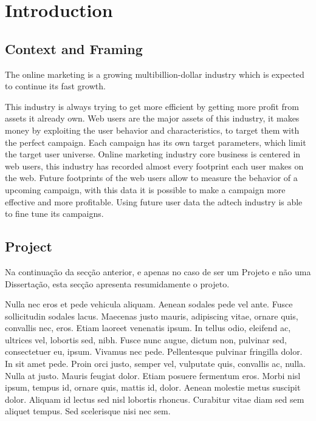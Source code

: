 \chapter{Introduction} \label{chap:intro}


\section{Context and Framing} \label{sec:context}

The online marketing is a growing multibillion-dollar industry \cite{PricewaterhouseCoopers2013}
which is expected to continue its fast growth.\cite{PricewaterhouseCoopers2013a}

This industry is always trying to get more efficient by getting more profit from assets it already own. 
Web users are the major assets of this industry, it makes money by exploiting the user behavior and characteristics, to target them with the
perfect campaign. Each campaign has its own target parameters, which limit the target user universe.
Online marketing industry core business is centered in web users, this industry has recorded almost every footprint each user makes on the web.
Future footprints of the web users allow to measure the behavior of a upcoming campaign, with this data it is possible to make a campaign more
effective and more profitable. Using future user data the adtech industry is able to fine tune its campaigns. 

\section{Project} \label{sec:proj}

Na continuação da secção anterior, e apenas no caso de ser um Projeto
e não uma Dissertação, esta secção apresenta resumidamente o projeto.

Nulla nec eros et pede vehicula aliquam. Aenean sodales pede vel
ante. Fusce sollicitudin sodales lacus. Maecenas justo mauris,
adipiscing vitae, ornare quis, convallis nec, eros. Etiam laoreet
venenatis ipsum. In tellus odio, eleifend ac, ultrices vel, lobortis
sed, nibh. Fusce nunc augue, dictum non, pulvinar sed, consectetuer
eu, ipsum. Vivamus nec pede. Pellentesque pulvinar fringilla dolor. In
sit amet pede. Proin orci justo, semper vel, vulputate quis, convallis
ac, nulla. Nulla at justo. Mauris feugiat dolor. Etiam posuere
fermentum eros. Morbi nisl ipsum, tempus id, ornare quis, mattis id,
dolor. Aenean molestie metus suscipit dolor. Aliquam id lectus sed
nisl lobortis rhoncus. Curabitur vitae diam sed sem aliquet
tempus. Sed scelerisque nisi nec sem. 

